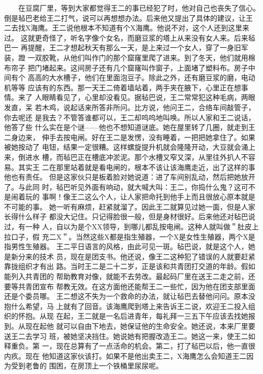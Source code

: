 　　在豆腐厂里，等到大家都觉得王二的事已经犯了时，他对自己也丧失了信心。
倒是毡巴老给王二打气，说可以再想想办法。后来他又提出了具体的建议，让王
二去找X海鹰。王二说他根本不知道有个X海鹰。他说不对，这个人还到这里来过。
这就更奇怪了，听名字像个女名，而磨豆浆的塔上从来没有女人来。后来毡巴一
再提醒，王二才想起秋天有那么一天，是上来过一个女人，穿了一身旧军装，蹬
一双胶靴，从他们叫作门的那个窟窿里爬了进来。到了冬天，他们就用棉布帘子
把门堵起来。这间房子还有几个窟窿叫作窗子，上面堵了塑料布。房子中间有个
高高的大水槽子，他们在里面泡豆子。除此之外，还有磨豆浆的磨，电动机等等
应该有的东西。那一天王二倚着墙站着，两手夹在腋下，心里正在想事情。来了
人眼睛看见了，心里却没看见。据毡巴说，王二常常犯这种毛病，两眼发直，呆
若木鸡，说起话来所答非所问。比方说，他问王二，合络车间敲管子，你去呢还
是我去？不管答谁都可以，王二却呜呜地叫唤。所以人家和王二说话，他答了些
什么实在是个谜——他也不想知道谜底。她在屋里转了几圈，就走到王二身边来，
伸手去按电闸。好在王二是发愣，没有睡着，一把把她拿住了。如果被她按动了
电钮，结果一定很糟。这样螺旋提升机就会隆隆开动，大豆就会涌上来，倒进水
槽，而毡巴正在槽底冲淤泥。那个水槽又窄又深，从里往外扒人不容易。其实王
二在那里站着就是看电闸的，根本不该让该海鹰走近，出了这样的事他也有责任。
但是这家伙只是板着脸对她说道：进了车间别乱动，然后把她放开了。与此同
时，毡巴听见外面有响动，就大喊大叫：王二，你捣什么鬼？这可不是闹着玩的
事啊！像王二这么个人，让人家把命托到他手上而且很放心原本就是不可能的事。
她一听有麻烦，赶紧就溜了。因此王二就算见过她一面，但是人家长得什么样子
都没大记住。只记得脸很一般，但是身材很好。后来他还对毡巴说过，有一种
人，自以为是个XX领导，到哪儿都乱按电闸。这种人就叫做＂肚皮上拉口子，假
充二X＂。当然这些X都是指生殖器，一个X是女性生殖器，两个X是指男性生殖器。
王二平日语言的风格，由此可见一斑。毡巴说，就是这个人，她是新分来的技术
员，现在是团支书。他还说，像王二这种犯了错误的人就要赶紧靠拢组织才有出
路。当时王二是二十二岁，正是该和共青团打交道的年龄。假如能列入共青团的
帮助教育对像，就能不去劳改。最起码厂里在送王二走之前，还要等共青团宣布
帮教无效。在这方面他还能帮王二一些忙，因为他在团支部里面还是个委员哪。
王二想这不失为一个救命的办法，就让毡巴去替他问问。原本没抱什么希望，马
上就有了回音。该海鹰爬到塔上来告诉王二说，欢迎王二投入组织的怀抱。从现
在起，王二就是一名后进青年，每礼拜一三五下午应该去找她报到。从现在起他
就可以自由下地去，她保证他的生命安全。她还说，本来厂里要送王二去学习
班，被她坚决挡住。她说她有把握改造王二。她这一来，使王二如释重负。第
一，现在总算有了一点活命的机会。第二，打了毡巴以后，他一直很内疚。现在
他知道这家伙该打。如果不是他出卖王二，X海鹰怎么会知道王二因为受到老鲁的
围困，在房顶上一个铁桶里尿尿呢。

